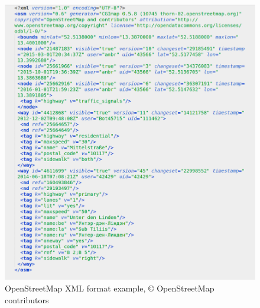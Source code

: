 \begin{figure}
\includegraphics[scale=.478]{osmxml2.png}
\caption{OpenStreetMap XML format example, {\copyright} OpenStreetMap contributors }
\label{fg:osmxml}
\end{figure}

